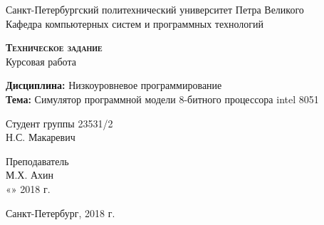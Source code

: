 \begin{titlepage}
  \begin{center}
    \large
    Санкт-Петербургский политехнический университет Петра Великого\\
    Кафедра компьютерных систем и программных технологий
    
    \vfill
 
    \textsc{\bf \LARGE Техническое задание}\\[5mm]
    \Large{
    Курсовая работа
    }\\[5mm]
     
    {
    
    \Large {\bf Дисциплина:} Низкоуровневое программирование\\[2mm]
    {\bf Тема:} Симулятор программной модели 8-битного процессора intel 8051
    
    }
  \bigskip
     
\end{center}
\vfill
 
\newlength{\ML}
\hfill\begin{minipage}{0.4\textwidth}
  Студент группы 23531/2\\
  \underline{\hspace{\ML}} Н.С. Макаревич\\
\end{minipage}
\bigskip
 
\hfill\begin{minipage}{0.4\textwidth}
  Преподаватель\\
  \underline{\hspace{\ML}} М.Х. Ахин\\
  «\underline{\hspace{0.7cm}}» \underline{\hspace{2cm}} 2018 г.
\end{minipage}%
\vfill
 
\begin{center}
  Санкт-Петербург, 2018 г.
\end{center}
\end{titlepage}
